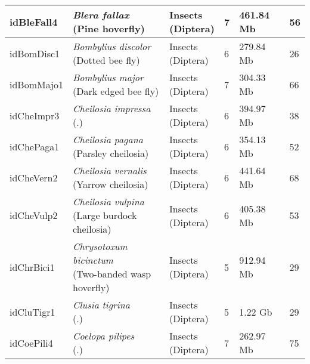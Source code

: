 \begin{centering}
\begin{longtable}{l|l|l|l|l|l}
idBleFall4 & \makecell[{l}]{\textit{Blera fallax} \\ (Pine hoverfly)} & \makecell[{l}]{Insects \\ (Diptera)} & 7 & 461.84 Mb & 56  \\ \hline
idBomDisc1 & \makecell[{l}]{\textit{Bombylius discolor} \\ (Dotted bee fly)} & \makecell[{l}]{Insects \\ (Diptera)} & 6 & 279.84 Mb & 26  \\ \hline
idBomMajo1 & \makecell[{l}]{\textit{Bombylius major} \\ (Dark edged bee fly)} & \makecell[{l}]{Insects \\ (Diptera)} & 7 & 304.33 Mb & 66  \\ \hline
idCheImpr3 & \makecell[{l}]{\textit{Cheilosia impressa} \\ (.)} & \makecell[{l}]{Insects \\ (Diptera)} & 6 & 394.97 Mb & 38  \\ \hline
idChePaga1 & \makecell[{l}]{\textit{Cheilosia pagana} \\ (Parsley cheilosia)} & \makecell[{l}]{Insects \\ (Diptera)} & 6 & 354.13 Mb & 52  \\ \hline
idCheVern2 & \makecell[{l}]{\textit{Cheilosia vernalis} \\ (Yarrow cheilosia)} & \makecell[{l}]{Insects \\ (Diptera)} & 6 & 441.64 Mb & 68  \\ \hline
idCheVulp2 & \makecell[{l}]{\textit{Cheilosia vulpina} \\ (Large burdock cheilosia)} & \makecell[{l}]{Insects \\ (Diptera)} & 6 & 405.38 Mb & 53  \\ \hline
idChrBici1 & \makecell[{l}]{\textit{Chrysotoxum bicinctum} \\ (Two-banded wasp hoverfly)} & \makecell[{l}]{Insects \\ (Diptera)} & 5 & 912.94 Mb & 29  \\ \hline
idCluTigr1 & \makecell[{l}]{\textit{Clusia tigrina} \\ (.)} & \makecell[{l}]{Insects \\ (Diptera)} & 5 & 1.22 Gb & 29  \\ \hline
idCoePili4 & \makecell[{l}]{\textit{Coelopa pilipes} \\ (.)} & \makecell[{l}]{Insects \\ (Diptera)} & 7 & 262.97 Mb & 75  \\ \hline

\end{longtable}
\end{centering}
